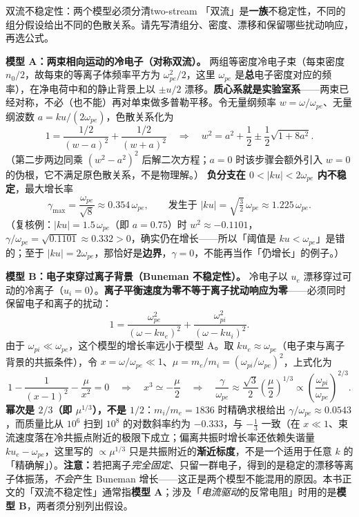 \documentclass[12pt,a4paper,openany,oneside]{book}
\begin{document}
\begin{theorem}{双流不稳定性：两个模型必须分清}{two-stream}
「双流」是\textbf{一族}不稳定性，不同的组分假设给出不同的色散关系。请先写清组分、密度、漂移和保留哪些扰动响应，再选公式。

\smallskip
\textbf{模型 A：两束相向运动的冷电子（对称双流）。} 两组等密度冷电子束（每束密度 $n_0/2$，故每束的等离子体频率平方为 $\omega_{pe}^2/2$，这里 $\omega_{pe}$ 是\textbf{总}电子密度对应的频率），在净电荷中和的静止背景上以 $\pm u/2$ 漂移。\textbf{质心系就是实验室系}——两束已经对称，不必（也不能）再对单束做多普勒平移。令无量纲频率 $w=\omega/\omega_{pe}$、无量纲波数 $a=ku/(2\omega_{pe})$，色散关系化为
\[
1=\frac{1/2}{(w-a)^2}+\frac{1/2}{(w+a)^2}
\quad\Longrightarrow\quad
w^2=a^2+\frac12\pm\frac12\sqrt{1+8a^2}.
\]
（第二步两边同乘 $(w^2-a^2)^2$ 后解二次方程；$a=0$ 时该步骤会额外引入 $w=0$ 的伪根，它不满足原色散关系，不是物理解。）
\textbf{负分支在 $0<|ku|<2\omega_{pe}$ 内不稳定}，最大增长率
\[
\gamma_{\max}=\frac{\omega_{pe}}{\sqrt8}\approx0.354\,\omega_{pe},\qquad \text{发生于 }|ku|=\sqrt{\tfrac32}\,\omega_{pe}\approx1.225\,\omega_{pe}.
\]
（复核例：$|ku|=1.5\,\omega_{pe}$（即 $a=0.75$）时 $w^2\approx-0.1101$，$\gamma/\omega_{pe}=\sqrt{0.1101}\approx0.332>0$，确实仍在增长——所以「阈值是 $ku<\omega_{pe}$」是错的；至于 $|ku|=2\omega_{pe}$，那恰好是\textbf{边界}，$\gamma=0$，不能再当作「仍增长」的例子。）

\smallskip
\textbf{模型 B：电子束穿过离子背景（Buneman 不稳定性）。} 冷电子以 $u_e$ 漂移穿过可动的冷离子（$u_i=0$）。\textbf{离子平衡速度为零不等于离子扰动响应为零}——必须同时保留电子和离子的扰动：
\[
1=\frac{\omega_{pe}^2}{(\omega-ku_e)^2}+\frac{\omega_{pi}^2}{(\omega-ku_i)^2}.
\]
由于 $\omega_{pi}\ll\omega_{pe}$，这个模型的增长率远小于模型 A。取 $ku_e\approx\omega_{pe}$（电子束与离子背景的共振条件），令 $x=\omega/\omega_{pe}\ll1$、$\mu=m_e/m_i=(\omega_{pi}/\omega_{pe})^2$，上式化为
\[
1-\frac{1}{(x-1)^2}-\frac{\mu}{x^2}=0
\quad\Longrightarrow\quad
x^3\simeq-\frac{\mu}{2}
\quad\Longrightarrow\quad
\frac{\gamma}{\omega_{pe}}\approx\frac{\sqrt3}{2}\left(\frac{\mu}{2}\right)^{1/3}\propto\left(\frac{\omega_{pi}}{\omega_{pe}}\right)^{2/3}.
\]
\textbf{幂次是 $2/3$（即 $\mu^{1/3}$），不是 $1/2$}：$m_i/m_e=1836$ 时精确求根给出 $\gamma/\omega_{pe}\approx0.0543$，而质量比从 $10^6$ 扫到 $10^8$ 的对数斜率约为 $-0.333$，与 $-\tfrac13$ 一致（在 $x\ll1$、束流速度落在冷共振点附近的极限下成立；偏离共振时增长率还依赖失谐量 $ku_e-\omega_{pe}$，这里写的 $\propto\mu^{1/3}$ 只是共振附近的\textbf{渐近标度}，不是一个适用于任意 $k$ 的「精确解」）。\textbf{注意：}若把离子\emph{完全固定}、只留一群电子，得到的是稳定的漂移等离子体振荡，\emph{不会}产生 Buneman 增长——这正是两个模型不能混用的原因。本书正文的「双流不稳定性」通常指\textbf{模型 A}；涉及「\emph{电流驱动}的反常电阻」时用的是\textbf{模型 B}，两者须分别列出假设。
\end{theorem}
\end{document}
